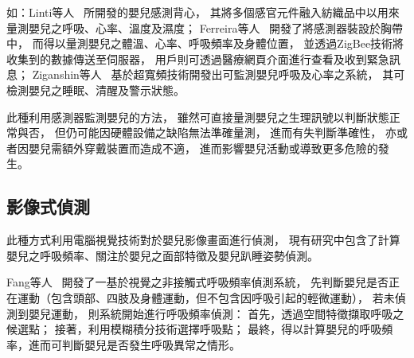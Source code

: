 \documentclass[class=NCU_thesis, crop=false]{standalone}
\begin{document}
如：Linti等人~\cite{lintiSensoryBabyVestForTheMonitoringOfInfants2006}
所開發的嬰兒感測背心，
其將多個感官元件融入紡織品中以用來量測嬰兒之呼吸、心率、溫度及濕度；
Ferreira等人~\cite{ferreiraASmartWearableSystemForSuddenInfantDeathSyndromeMonitoring2016}
開發了將感測器裝設於胸帶中，
而得以量測嬰兒之體溫、心率、呼吸頻率及身體位置，
並透過ZigBee技術將收集到的數據傳送至伺服器，
用戶則可透過醫療網頁介面進行查看及收到緊急訊息；
Ziganshin等人~\cite{ziganshinUWBBabyMonitor2010}
基於超寬頻技術開發出可監測嬰兒呼吸及心率之系統，
其可檢測嬰兒之睡眠、清醒及警示狀態。

此種利用感測器監測嬰兒的方法，
雖然可直接量測嬰兒之生理訊號以判斷狀態正常與否，
但仍可能因硬體設備之缺陷無法準確量測，
進而有失判斷準確性，
亦或者因嬰兒需額外穿戴裝置而造成不適，
進而影響嬰兒活動或導致更多危險的發生。




\subsection{影像式偵測}
此種方式利用電腦視覺技術對於嬰兒影像畫面進行偵測，
現有研究中包含了計算嬰兒之呼吸頻率、關注於嬰兒之面部特徵及嬰兒趴睡姿勢偵測。

Fang等人~\cite{fangAVisionBasedInfantRespiratoryFrequencyDetectionSystem2015}
開發了一基於視覺之非接觸式呼吸頻率偵測系統，
先判斷嬰兒是否正在運動（包含頭部、四肢及身體運動，但不包含因呼吸引起的輕微運動），
若未偵測到嬰兒運動，
則系統開始進行呼吸頻率偵測：
首先，透過空間特徵擷取呼吸之候選點；
接著，利用模糊積分技術選擇呼吸點；
最終，得以計算嬰兒的呼吸頻率，進而可判斷嬰兒是否發生呼吸異常之情形。
\end{document}
